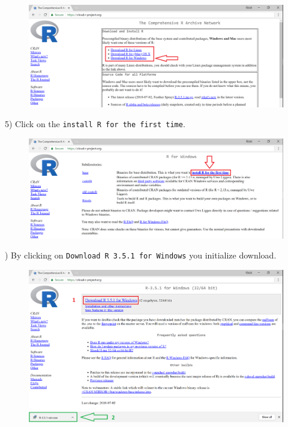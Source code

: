 \documentclass{article}\usepackage[]{graphicx}\usepackage[]{color}
\begin{document}
\begin{figure}[!h]
 \includegraphics[width=\textwidth,height=\textheight,keepaspectratio]{./Images/image_03.png}
\end{figure}\vspace{4cm}

5) Click on the \texttt{install R for the first time}. 

\begin{figure}[!h]
 \includegraphics[width=\textwidth,height=\textheight,keepaspectratio]{./Images/image_04.png}
\end{figure}

) By clicking on \texttt{Download R 3.5.1 for Windows} you initialize download.

\begin{figure}[!h]
 \includegraphics[width=\textwidth,height=\textheight,keepaspectratio]{./Images/image_05.png}
\end{figure}
\end{document}
